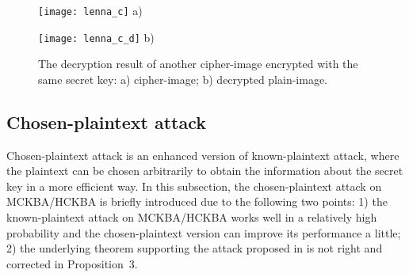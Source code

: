\documentclass{ws-ijbc}
\newlength\figwidth
\begin{document}
\begin{figure}[!htb]
\centering
\begin{minipage}{\figwidth}
\centering
\texttt{[image: lenna\_c]}
a)
\end{minipage}
\begin{minipage}{\figwidth}
\centering
\texttt{[image: lenna\_c\_d]}
b)
\end{minipage}
\caption{The decryption result of another cipher-image encrypted with the same secret key: a) cipher-image; b)
decrypted plain-image.}
\label{fig:DecryptedLenna}
\end{figure}

\subsection{Chosen-plaintext attack}

Chosen-plaintext attack is an enhanced version of known-plaintext attack, where the plaintext can be chosen arbitrarily to
obtain the information about the secret key in a more efficient way. In this subsection, the chosen-plaintext attack on MCKBA/HCKBA is briefly
introduced due to the following two points: 1) the known-plaintext attack on MCKBA/HCKBA works well in a relatively high probability and the chosen-plaintext
version can improve its performance a little; 2) the underlying theorem supporting the attack proposed in \cite[Theorem 1]{LCQ:MCKBA:IJBC11} is not right and corrected in Proposition~3.
\end{document}
